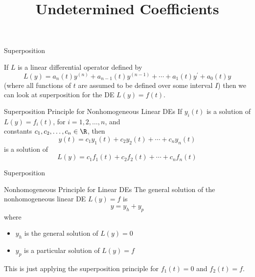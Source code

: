 \documentclass{beamer}
\title[MATH 2250 - Section 4.4]{Undetermined Coefficients}
\begin{document}
\begin{frame}
  \titlepage
\end{frame}

\begin{frame}{Superposition}
\begin{block}{}
If $L$ is a linear differential operator defined by
\begin{equation*}
L(y)=a_n(t)y^{(n)}+a_{n-1}(t)y^{(n-1)}+\cdots+a_1(t)y^\prime+a_0(t)y
\end{equation*}
(where all functions of $t$ are assumed to be defined over some interval $I$) then we can look at superposition for the DE $L(y)=f(t)$.
\end{block}\pause

\begin{block}{Superposition Principle for Nonhomogeneous Linear DEs}
If $y_i(t)$ is a solution of $L(y)=f_i(t)$, for $i=1,2,\ldots,n$, and\\ constants $c_1,c_2,\ldots,c_n\in\R$, then
\begin{equation*}
y(t)=c_1 y_1(t) + c_2 y_2(t) + \cdots + c_n y_n(t)
\end{equation*}
is a solution of
\begin{equation*}
L(y)=c_1 f_1(t) + c_2 f_2(t) + \cdots + c_n f_n(t)
\end{equation*}
\end{block}
\end{frame}

\begin{frame}{Superposition}
\begin{block}{Nonhomogeneous Principle for Linear DEs}
The general solution of the nonhomogeneous linear DE $L(y)=f$ is
\begin{equation*}
y=y_h+y_p
\end{equation*}
where
\begin{itemize}
\item $y_h$ is the general solution of $L(y)=0$
\item $y_p$ is a particular solution of $L(y)=f$
\end{itemize}
\end{block}\pause

\begin{block}{}
This is just applying the superposition principle for $f_1(t)=0$ and $f_2(t)=f$.
\end{block}
\end{frame}
\end{document}
